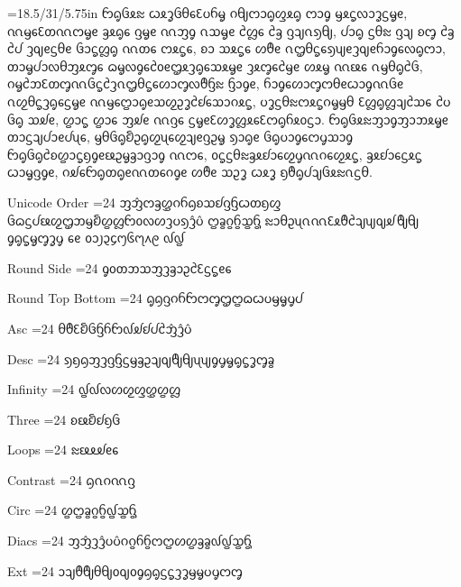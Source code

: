 







\sizes={18.5/31/5.75in}
\dotext ᦝᧂᦑᦸᦰ ᦍᦸᧆᦑᦲᧈᦷᦢᦆᧄ ᦅᧀᦂᦱᧂᦐᦸᧂ ᦂᦱᧁ ᦙᦸᧃᦟᦱᧆᦓᧄᧉ, ᦶᦙᧈᦷᦎᦶᦂᧄᧉ ᦃᦸᧂᧈ ᦋᧄᧉ ᦶᦀᧁ ᦵᦉᧄᧉ ᦺᦜᧈ ᦺᦃ ᦋᦻᦵᦣᧀ, ᦔᦱᧂ ᦓᦲᦰ ᦋᦻ ᦈᧅ ᦺᦃ ᦺᦔ ᦡᦽᧉᦓᦲᧉ ᦑᦱᧃᦜᧂ ᦶᦎᧈ ᦂᦸᧃᧈ, ᦈᦱ ᦉᦸᧃᧈ ᦠᦹᧉ ᦵᦗᦲᧃᧈᦣᦼᧉᦡᦽᧉᦆᦱᧁᧈᦟᧂᦂᦱ, ᦎᦱᧄᦔᦱᦟᦲᦀᦸᧅᧈ ᦒᧄᦟᧁᧈᦺᦞᧉᦗᦸᦡᧂᧈᦉᦸᧄᧉ ᦡᦸᧅᧈᦺᦙᧉ ᦠᦸᧄ ᦶᦕᧈ ᦵᦙᦲᧂᦺᦑ, ᦅᧄᦺᦘᦷᦎᧅᦶᦑᧃᦺᦡᦵᦗᦲᧃᧈᦠᦱᧅᦟᦹᦌᦰ ᦌᦱᧁᧉ, ᦆᦱᧁᧈᦠᦱᧅᦂᦲᧉᦍᦱᧁᦶᦑᧉ ᦵᦖᦲᧃᦡᧂᧈᦓᧄᧉ ᦶᦙᧈᦦᦱᧂᧉᦉᦖᦳᧆᦺᦊᧈᦉᦱᦅᦸᧃ, ᦢᧆᦓᦲᦰᦂᦸᧃᦅᧄᦙᦲ ᦷᦜᧂᦜᦻᦺᦉᧈ ᦺᦢ ᦑᧂ ᦉᦾᧉ, ᦛᦱᧃ ᦛᦱᧈ ᦀᦾᧉ ᦶᦋᧈ ᦓᧄᧉᦷᦠᧆᦜᦸᧈᦷᦂᧂᦆᦸᦞᦓᦱ. ᦝᧂᦑᦸᦰᦀᦱᧁᦀᦱᦘᦸᧄᧉ ᦎᦱᦓᦻᦔᦱᧉᦔᦴᧈ, ᦙᦲᦑᧂᦚᦳᧂᦖᦴᧈᦖᦻᧉᦋᦳᧄ ᦣᦱᧂᧉ ᦑᧂᦢᦱᧁᧈᦂᧇᦉᦱᧁ ᦝᧂᦑᧂᦺᦈᦛᦱᧃᦏᧁᧉᦕᦳᧄᦃᦱᦋᦱᧁ ᦶᦂᧈ, ᦞᧃᦓᦲᦰᦃᦸᦊᦱᧈᦖᧇᦶᦅᧈᦖᦸᧃ, ᦃᦸᦊᦱᧈᦓᦸᧃ ᦍᦱᧄᦋᧁᧉ, ᦅᦾᧈᦝᧂᦎᧂᧉᦶᦎᧈᦅᧁᧉ ᦠᦹᧉ ᦉᦳᧆ ᦍᦸᧆ ᦏᦹᧂᦔᦻᦑᦸᦰᦵᦓᦲ.

\eject

\dotext Unicode Order
\sizes={24}
\dotext ᦀᦁᦂᦃᦄᦅᦆᦇᦈᦉᦊᦋᦌᦍᦎᦏᦐ
\dotext ᦑᦒᦓᦔᦕᦖᦗᦘᦙᦚᦛᦜᦝᦞᦟᦠᦡᦢᦣᦤᦥ
\dotext ᦦᦧᦨᦩᦪᦫ
\dotext ᦰᦱᦲᦳᦴᦵᦶᦷᦸᦹᦺᦻᦼᦽᦾᦿᧀ
\dotext ᧁᧂᧃᧄᧅᧆᧇ
\dotext ᧈᧉ
\dotext ᧐᧑᧒᧓᧔᧕᧖᧗᧘᧙
\dotext ᧞᧟

\dotext Round Side
\sizes={24}
\dotext ᧁᦞᦎᦘᦉᦀᦡᦃᦱᦳᦺᦷᦓᧃᧉᧈ

\dotext Round Top Bottom
\sizes={24}
\dotext ᧂᦇᦋᦅᦆᦝᦂᧅᦗᦦᦒᦍᦢᦙᧄᧇᦔ

\dotext Asc
\sizes={24}
\dotext ᦲᦹᦷᦚᦑᦌᦆᦝ᧞ᦾᦊᦔᦺᦁᦤᦥ

\dotext Desc
\sizes={24}
\dotext ᦣᦏᦇᦀᦡᦋᦌᦓᦙᦃᦳᦻᦽᦿᧀᦴᦼᧁᧇᧄᧂᧃᧆᧅᦧ

\dotext Infinity
\sizes={24}
\dotext ᧟᧞ᦟᦠᦖᦐᦄᦛᦜ

\dotext Three
\sizes={24}
\dotext ᦈᦕᦚᦊᦏᦑ

\dotext Loops
\sizes={24}
\dotext ᦰᦕᦸᦾᧉᧈ

\dotext Contrast
\sizes={24}
\dotext ᦇᦵᦅᦶᦋ

\dotext Circ
\sizes={24}
\dotext ᦛᦦᦧᦨᦩ᧟ᦪᦫ

\dotext Diacs
\sizes={24}
\dotext ᦀᦁᦡᦤᦢᦥᦅᦨᦆᦩᦂᦦᦠᦛᦃᦧ᧞᧟ᦪᦫ

\dotext Ext
\sizes={24}
\dotext ᦱᦻᦹᦿᦲᧀᦞᦽᦞᧁᦇᧂᦓᧃᦡᧆᦙᧄᦢᧇᦂᧅ

